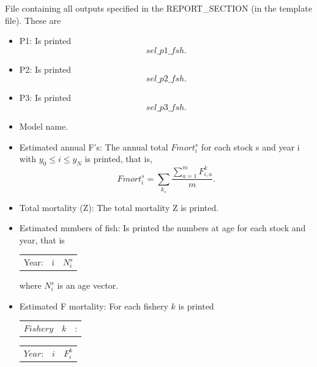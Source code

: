\documentclass{article}
\newcounter{subsubsubsection}[subsubsection]
\begin{document}
    
     File containing all outputs specified in the REPORT\_SECTION (in the template file). These are 
    \begin{itemize}
        \item P1: Is printed \begin{equation*}
            sel\_p1\_fsh.
        \end{equation*}
        \item P2: Is printed  \begin{equation*}
            sel\_p2\_fsh.
        \end{equation*}
        \item P3: Is printed \begin{equation*}
            sel\_p3\_fsh.
        \end{equation*}
    \item Model name.
    \item Estimated annual F's: The annual total $Fmort^s_{i}$ for each stock s and year i with $y_0 \leq i \leq y_N$ is printed, that is,
    \begin{equation*}
        Fmort^s_i= \sum_{k_s} \dfrac{\sum_{a=1}^mF^{k}_{i,a}}{m}.
    \end{equation*}

   \item Total mortality (Z): The total mortality Z is printed.
    \item Estimated numbers of fish: Is printed the numbers at age for each stock and year, that is
    \begin{center}
    \begin{tabular}{c c c}
        Year: & i & $N^s_{i}$\\
    \end{tabular}
        \end{center}
where $N^s_i$ is an age vector.
    \item Estimated F mortality: For each fishery $k$ is printed
    \begin{center}
        \begin{tabular}{c c c}
           $Fishery$  &  $k$ & : \\
            
        \end{tabular}
    \end{center}
    \begin{center}
        \begin{tabular}{c c c }
          $Year$:   & $i$  & $F^k_i$ \\
        

\end{tabular}
\end{center}
\end{itemize}
\end{document}
